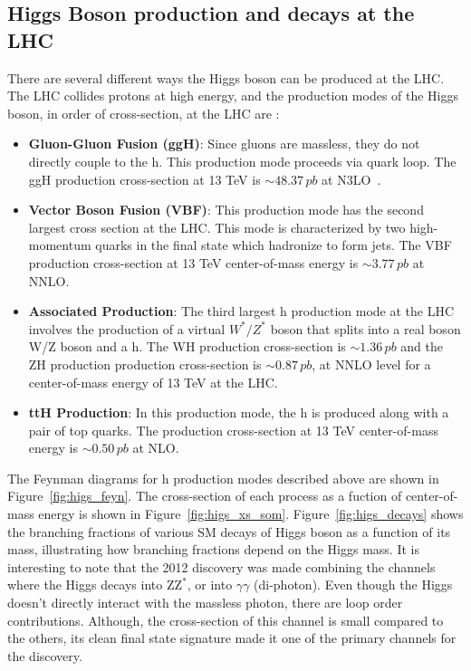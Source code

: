 \subsection{Higgs Boson production and decays at the LHC}
There are several different ways the Higgs boson can be produced at the LHC. The LHC collides protons at high energy, and the production modes of the Higgs boson, in order of cross-section, at the LHC are :

\begin{itemize}%
\item \textbf{Gluon-Gluon Fusion (ggH)}: Since gluons are massless, they do not directly couple to the h. This production mode proceeds via quark loop. The ggH production cross-section at 13 TeV is $\sim48.37\,pb$ at N3LO~\cite{YR4}. 
\item \textbf {Vector Boson Fusion (VBF)}: This production mode has the second largest cross section at the LHC. This mode is characterized by two high-momentum quarks in the final state which hadronize to form jets. The VBF production cross-section at 13 TeV center-of-mass energy is $\sim3.77\,pb$ at NNLO.
\item \textbf {Associated Production}: The third largest h production mode at the LHC involves the production of a virtual $W^*/Z^*$ boson that splits into a real boson W/Z boson and a h. The WH production cross-section is  $\sim1.36\,pb$ and the ZH production production cross-section is $\sim0.87\,pb$, at NNLO level for a center-of-mass energy of 13 TeV at the LHC.
\item \textbf {ttH Production}:   In this production mode, the h is produced along with a pair of top quarks. The production cross-section at 13 TeV center-of-mass energy is $\sim0.50\,pb$ at NLO.
\end{itemize}
  
The Feynman diagrams for h production modes described above are shown in Figure~\ref{fig:higs_feyn}. The cross-section of each process as a fuction of center-of-mass energy is shown in Figure~\ref{fig:higs_xs_som}. Figure~\ref{fig:higs_decays} shows the branching fractions of various SM decays of Higgs boson as a function of its mass, illustrating how branching fractions depend on the Higgs mass. It is interesting to note that the 2012 discovery was made combining the channels where the Higgs decays into Z$\mathrm{Z}^*$, or into $\gamma\gamma$ (di-photon). Even though the Higgs doesn't directly interact with the massless photon, there are loop order contributions. Although, the cross-section of this channel is small compared to the others, its clean final state signature made it one of the primary channels for the discovery.    


